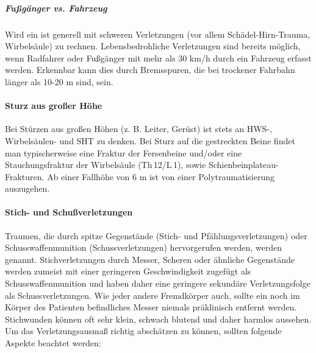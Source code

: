 \subparagraph{Fußgänger vs. Fahrzeug}

Wird ein  ist generell mit schweren Verletzungen (vor allem Schädel-Hirn-Trauma, Wirbelsäule) zu rechnen. 
Lebensbedrohliche Verletzungen sind bereits möglich, wenn Radfahrer oder Fußgänger mit mehr als 30 km/h durch ein Fahrzeug erfasst werden. Erkennbar kann dies durch Bremsspuren, die bei trockener Fahrbahn länger als 10-20 m sind, sein.

\paragraph{Sturz aus großer Höhe}

Bei Stürzen aus großen Höhen (z. B. Leiter, Gerüst) ist stets
an HWS-, Wirbelsäulen- und SHT zu denken. Bei Sturz auf die
gestreckten Beine findet man typischerweise eine Fraktur der
Fersenbeine und/oder eine Stauchungsfraktur der Wirbelsäule
(Th\,12/L\,1), sowie Schienbeinplateau-Frakturen. Ab einer
Fallhöhe von 6 m ist von einer Polytraumatisierung
auszugehen.

\paragraph{Stich- und Schußverletzungen}
Traumen, die durch spitze Gegenstände (Stich- und
Pfählungsverletzungen) oder Schusswaffenmunition
(Schussverletzungen) hervorgerufen werden, werden
 genannt. Stichverletzungen
durch Messer, Scheren oder ähnliche Gegenstände werden
zumeist mit einer geringeren Geschwindigkeit zugefügt als
Schusswaffenmunition und haben daher eine geringere sekundäre
Verletzungsfolge als Schussverletzungen. Wie jeder andere
Fremdkörper auch, sollte ein noch im Körper des Patienten
befindliches Messer niemals präklinisch entfernt werden.
Stichwunden können oft sehr klein, schwach blutend und daher
harmlos aussehen. Um das Verletzungsausmaß richtig abschätzen
zu können, sollten folgende Aspekte beachtet werden:


